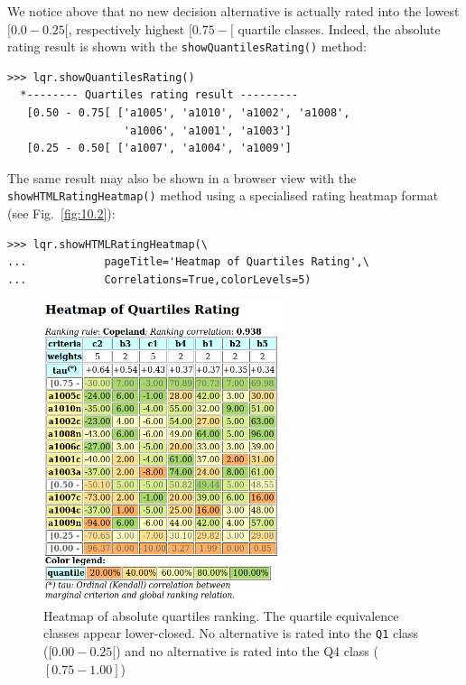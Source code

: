 We notice above that no new decision alternative is actually rated into the lowest $[0.0-0.25[$, respectively highest $[0.75- [$ quartile classes. Indeed, the absolute rating result is shown with the \texttt{showQuantilesRating()} method:
\begin{lstlisting}[caption={Absolute quartiles rating result},label=list:10.8]
>>> lqr.showQuantilesRating()
  *-------- Quartiles rating result ---------
   [0.50 - 0.75[ ['a1005', 'a1010', 'a1002', 'a1008',
                  'a1006', 'a1001', 'a1003']
   [0.25 - 0.50[ ['a1007', 'a1004', 'a1009']
\end{lstlisting}    

The same result may also be shown in a browser view with the \texttt{showHTMLRa\-tingHeatmap()} method using a specialised rating heatmap format (see Fig.~\vref{fig:10.2}): 
\begin{lstlisting}
>>> lqr.showHTMLRatingHeatmap(\
...            pageTitle='Heatmap of Quartiles Rating',\
...            Correlations=True,colorLevels=5)
\end{lstlisting}
\begin{figure}[ht]
\sidecaption[t]
 \includegraphics[width=7cm]{Figures/10-2-heatMap1.png}
\caption[Heatmap of absolute quartiles ranking]{Heatmap of absolute quartiles ranking. The quartile equivalence classes appear lower-closed. No alternative is rated into the \texttt{Q1} class ($[0.00 - 0.25[$) and no alternative is rated into the Q4 class ($[0.75 - 1.00]$)}
\label{fig:10.2}       %
\end{figure}
	    
